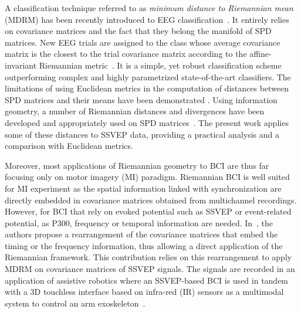 A classification technique referred to as \emph{minimum distance to Riemannian mean} (MDRM) has been recently introduced to EEG classification~\cite{barachant_multiclass_2012}. 
It entirely relies on covariance matrices and the fact that they belong the manifold of SPD matrices.
New EEG trials are assigned to the class whose average covariance matrix is the closest to the trial covariance matrix according to the affine-invariant Riemannian metric~\cite{moakher_differential_2005}.
It is a simple, yet robust classification scheme outperforming complex and highly parametrized state-of-the-art classifiers. 
The limitations of using Euclidean metrics in the computation of distances between SPD matrices and their means have been demonstrated \cite{arsigny_geometric_2007}. 
Using information geometry, a number of Riemannian distances and divergences have been developed and appropriately used on SPD matrices~\cite{amari_-divergence_2009,arsigny_geometric_2007}. %
The present work applies some of these distances to SSVEP data, providing a practical analysis and a comparison with Euclidean metrics.

Moreover, %
most applications of Riemannian geometry to BCI are thus far focusing only on motor imagery (MI) paradigm.
Riemannian BCI is well suited for MI experiment as the spatial information linked with synchronization are directly embedded in covariance matrices obtained from multichannel recordings.
However, for BCI that rely on evoked potential such as SSVEP or event-related potential, as P300, frequency or temporal information are needed. %
In~\cite{congedo_new_2013}, the authors propose a rearrangement of the covariance matrices that embed the timing or the frequency information, thus allowing a direct application of the Riemannian framework.  
This contribution relies on this rearrangement to apply MDRM on covariance matrices of SSVEP signals.
The signals are recorded in an application of assistive robotics where an SSVEP-based BCI is used in tandem with a 3D touchless interface based on infra-red (IR) sensors as a multimodal system to control an arm exoskeleton~\cite{kalunga_hybrid_2014}.

\iflatexml\else {} \fi
